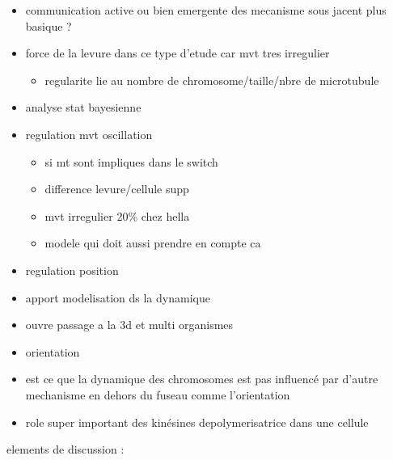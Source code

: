 \documentclass[12pt,a4paper,twoside,openright]{book}
\providecommand{\tightlist}{%
  \setlength{\itemsep}{0pt}\setlength{\parskip}{0pt}}
\begin{document}
\begin{itemize}
\item
  communication active ou bien emergente des mecanisme sous jacent plus
  basique ?
\item
  force de la levure dans ce type d'etude car mvt tres irregulier

  \begin{itemize}
  \tightlist
  \item
    regularite lie au nombre de chromosome/taille/nbre de microtubule
  \end{itemize}
\item
  analyse stat bayesienne
\item
  regulation mvt oscillation

  \begin{itemize}
  \tightlist
  \item
    si mt sont impliques dans le switch
  \item
    difference levure/cellule supp
  \item
    mvt irregulier 20\% chez hella
  \item
    modele qui doit aussi prendre en compte ca
  \end{itemize}
\item
  regulation position
\item
  apport modelisation ds la dynamique
\item
  ouvre passage a la 3d et multi organismes
\item
  orientation
\item
  est ce que la dynamique des chromosomes est pas influencé par d'autre
  mechanisme en dehors du fuseau comme l'orientation
\item
  role super important des kinésines depolymerisatrice dans une cellule
\end{itemize}

elements de discussion :
\end{document}
